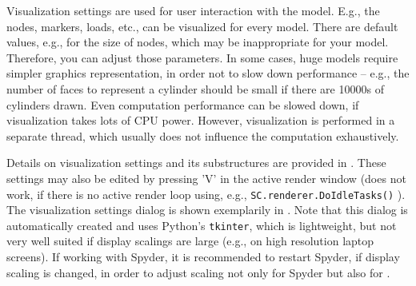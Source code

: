 %
Visualization settings are used for user interaction with the model. E.g., the nodes, markers, loads, etc., can be visualized for every model. There are default values, e.g., for the size of nodes, which may be inappropriate for your model. Therefore, you can adjust those parameters. In some cases, huge models require simpler graphics representation, in order not to slow down performance -- e.g., the number of faces to represent a cylinder should be small if there are 10000s of cylinders drawn. Even computation performance can be slowed down, if visualization takes lots of CPU power. However, visualization is performed in a separate thread, which usually does not influence the computation exhaustively.

Details on visualization settings and its substructures are provided in . These settings may also be edited by pressing 'V' in the active render window (does not work, if there is no active render loop using, e.g., \texttt{SC.renderer.DoIdleTasks()} ).
The visualization settings dialog is shown exemplarily in .
Note that this dialog is automatically created and uses Python's \texttt{tkinter}, which is lightweight, but not very well suited if display scalings are large (e.g., on high resolution laptop screens). If working with Spyder, it is recommended to restart Spyder, if display scaling is changed, in order to adjust scaling not only for Spyder but also for \codeName.


